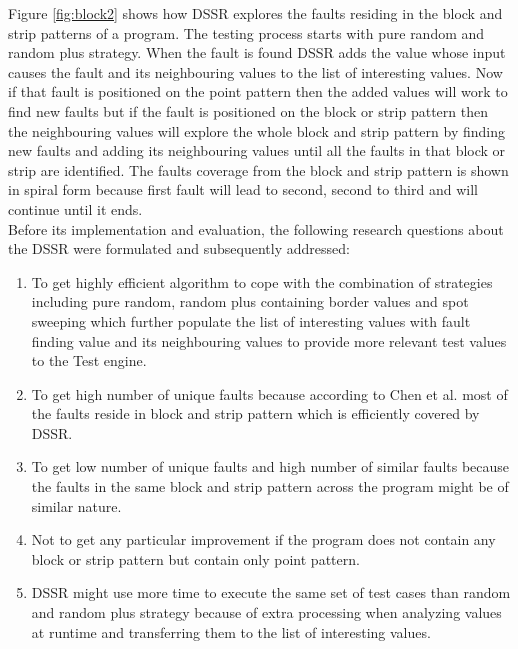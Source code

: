 \documentclass[10pt, conference, compsocconf]{IEEEtran}
\begin{document}
Figure \ref{fig:block2} shows how DSSR explores the faults residing in the block and strip patterns of a program. The testing process starts with pure random and random plus strategy. When the fault is found DSSR adds the value whose input causes the fault and its neighbouring values to the list of interesting values. Now if that fault is positioned on the point pattern then the added values will work to find new faults but if the fault is positioned on the block or strip pattern then the neighbouring values will explore the whole block and strip pattern by finding new faults and adding its neighbouring values until all the faults in that block or strip are identified. The faults coverage from the block and strip pattern is shown in spiral form because first fault will lead to second, second to third and will continue until it ends.\\

Before its implementation and evaluation, the following research questions about the DSSR were formulated and subsequently addressed:
\begin{enumerate}

\item To get highly efficient algorithm to cope with the combination of strategies including pure random, random plus containing border values and spot sweeping which further populate the list of interesting values with fault finding value and its neighbouring values to provide more relevant test values to the Test engine. 

\item To get high number of unique faults because according to Chen et al. \cite{Chen2006} most of the faults reside in block and strip pattern which is efficiently covered by DSSR. 

\item To get  low number of unique faults and high number of similar faults because the faults in the same block and strip pattern across the program might be of similar nature.

\item  Not to get any particular improvement if the program does not contain any block or strip pattern but contain only point pattern.

\item  DSSR might use more time to execute the same set of test cases than random and random plus strategy because of extra processing when analyzing values at runtime and transferring them to the list of interesting values.
\end{enumerate}
\end{document}
